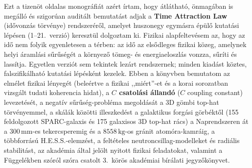 \documentclass[10pt,a4paper]{article}
\begin{document}
{\small{}\par
Ezt a tizen\"ot oldalas monogr\'afi\'at az\'ert \'irtam, hogy \'atl\'athat\'o, \"onmag\'aban is meg\'all\'o \'es szigor\'uan audit\'alt bemutat\'ast adjak a \textbf{Time Attraction Law} (id\H{o}vonz\'as t\"orv\'enye) rendszer\'er\H{o}l, amelyet huszonegy egym\'asra \'ep\"ul\H{o} kutat\'asi l\'ep\'esen (1--21.\ verzi\'o) kereszt\"ul dolgoztam ki. Fizikai alapfeltev\'esem az, hogy az id\H{o} nem folyik egyenletesen a t\'erben: az id\H{o} az els\H{o}dleges fizikai k\"ozeg, amelynek helyi \'araml\'asi s\H{u}r\H{u}s\'eg\'et a k\"ornyez\H{o} t\"omeg- \'es energiaeloszl\'as vonzza, s\H{u}r\'iti \'es lass\'itja. Egyetlen verzi\'ot sem tekintek lez\'art rendszernek; minden kiad\'ast k\"oztes, falszifik\'alhat\'o kutat\'asi l\'ep\'esk\'ent kezelek. Ebben a k\"onyvben bemutatom az elmélet fizikai l\'enyeg\'et (bele\'ertve a fizikai ,,mi\'ert''-et \'es a korai sorozatban vizsg\'alt tudati koherencia hidat), a \textbf{$C$ csatol\'asi \'alland\'o} ($C$ coupling constant) levezet\'es\'et, a negat\'iv s\H{u}r\H{u}s\'eg-probl\'ema megold\'as\'at a 3D g\"ombi top-hat t\"orv\'enyemmel, a sk\'al\'ak k\"oz\"otti illeszked\'est a galaktikus forg\'asi g\"orb\'ekt\H{o}l (155 feldolgozott SPARC-galaxis \'es 175 galaxisos 3D top-hat r\'acs) a Naprendszeren \'at a $300\,\text{mm}$-es tekercsperemig \'es a $8558\,\text{kg}$-os gr\'anit atom\'ora-kamr\'aig, a t\"obbforr\'as\'u H.E.S.S.-elemz\'est, a felt\'eteles neutroncsillag-modelleket \'es radi\'alis stabilit\'ast, az akad\'emia \'altal jel\"olt nyitott fizikai feladatokat, valamint a F\"uggel\'ekben sz\'or\'ol sz\'ora csatolt 3.\ k\"or\"os akad\'emiai b\'ir\'alati jegyz\H{o}k\"onyvet.

}
\end{document}
